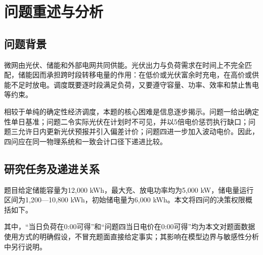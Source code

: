 \documentclass[withoutpreface,bwprint]{cumcmthesis}
\begin{document}
\section{问题重述与分析}

\subsection{问题背景}

微网由光伏、储能和外部电网共同供能。光伏出力与负荷需求在时间上不完全匹配，储能因而承担跨时段转移电量的作用：在低价或光伏富余时充电，在高价或供能不足时放电。调度既要逐时段满足负荷，又要遵守容量、功率、效率和禁止售电等约束。

相较于单纯的确定性经济调度，本题的核心困难是信息逐步揭示。问题一给出确定性单日基准；问题二令实际光伏在计划时不可见，并以5倍电价惩罚执行缺口；问题三允许日内更新光伏预报并引入偏差计价；问题四进一步加入波动电价。因此，四问应在同一物理系统和一致会计口径下递进比较。

\subsection{研究任务及递进关系}

题目给定储能容量为12,000 kWh，最大充、放电功率均为5,000 kW，储电量运行区间为1,200---10,800 kWh，初始储电量为6,000 kWh。本文将四问的决策权限概括如下。

\begin{table}[!htbp]
\centering\small
\caption{四个问题的信息结构与输出任务}
\end{table}

其中，“当日负荷在0:00可得”和“问题四当日电价在0:00可得”均为本文对题面数据使用方式的明确假设，不冒充题面直接给定事实；其影响在模型边界与敏感性分析中另行说明。
\end{document}
